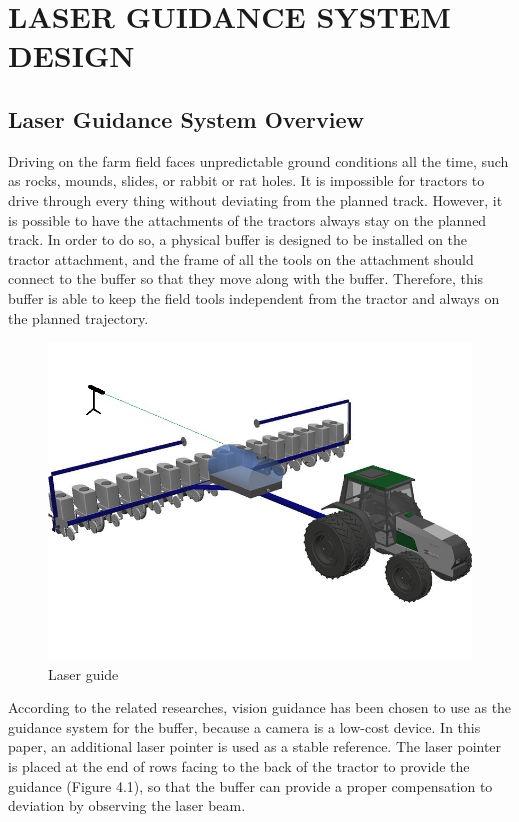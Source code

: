 \chapter{LASER GUIDANCE SYSTEM DESIGN}

\section{Laser Guidance System Overview}
Driving on the farm field faces unpredictable ground conditions all the time, such as rocks, mounds, slides, or rabbit or rat holes. It is impossible for tractors to drive through every thing without deviating from the planned track. However, it is possible to have the attachments of the tractors always stay on the planned track. In order to do so, a physical buffer is designed to be installed on the tractor attachment, and the frame of all the tools on the attachment should connect to the buffer so that they move along with the buffer. Therefore, this buffer is able to keep the field tools independent from the tractor and always on the planned trajectory.
\begin{figure}[ht!]
\begin{center}
\includegraphics[scale = 0.6]{pics/tractor.jpg}
\caption{Laser guide}
\end{center}
\end{figure}

According to the related researches, vision guidance has been chosen to use as the guidance system for the buffer, because a camera is a low-cost device. In this paper, an additional laser pointer is used as a stable reference. The laser pointer is placed at the end of rows facing to the back of the tractor to provide the guidance (Figure 4.1), so that the buffer can provide a proper compensation to deviation by observing the laser beam. 

